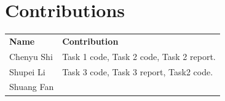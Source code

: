 \documentclass{article}
\begin{document}
\section*{Contributions}
\begin{tabular}{ll}
    \textbf{Name} & \textbf{Contribution}\\
    Chenyu Shi & Task 1 code, Task 2 code, Task 2 report.\\
    Shupei Li & Task 3 code, Task 3 report, Task2 code.\\
    Shuang Fan & \\
\end{tabular}
\end{document}
